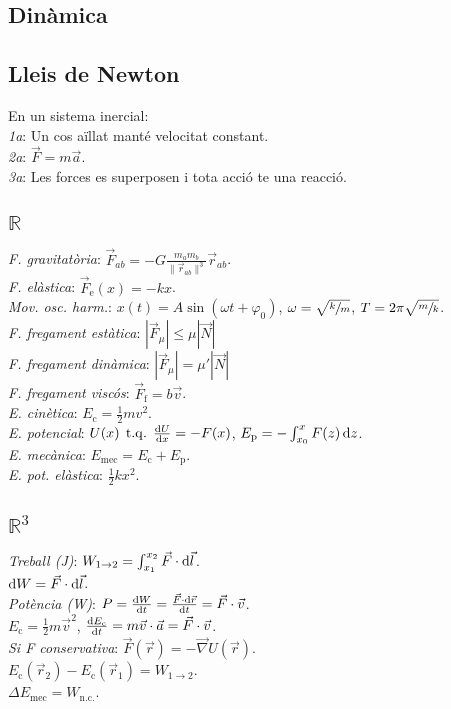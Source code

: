 \documentclass[11pt]{article}
\newcommand{\real}{\mathbb{R}}
\newcommand{\ci}{\textbullet\;}
\DeclareMathOperator{\tq}{\;t.q.\;}
\begin{document}
\begin{multicols}{4}
\section{Din\`amica}

\subsection{Lleis de Newton}
En un sistema inercial:\\
\emph{1a}: Un cos aïllat manté velocitat constant.\\
\emph{2a}: $\vec{F} = m\vec{a}$.\\
\emph{3a}: Les forces es superposen i tota acció te una reacció.

\subsection{$\real$}
\emph{F. gravitat\`oria}: $\vec{F}_{ab} = -G \frac{m_a m_b}{\|\vec{r}_{ab}\|^3} \vec{r}_{ab}$. \\
\emph{F. el\`astica}: $\vec{F}_{\text{e}}(x) = -kx$. \\
\emph{Mov. osc. harm.}: $x(t) = A\sin (\omega t + \varphi_0)$, $\omega = \sqrt{\sfrac{k}{m}}$, $T = 2\pi\sqrt{\sfrac{m}{k}}$. \\
\emph{F. fregament estàtica}: $|\vec{F}_\mu| \leq \mu |\vec{N}|$\\
\emph{F. fregament dinàmica}: $|\vec{F}_\mu| = \mu' |\vec{N}|$\\
\emph{F. fregament visc\'os}: $\vec{F}_{\text{f}} = b\vec{v}$. \\
\emph{E. cin\`etica}: $E_{\text{c}} = \frac{1}{2}mv^2$. \\
\emph{E. potencial}: $U(x) \tq \frac{\dif U}{\dif x} = -F(x)$, $E_{\text{p}} = -\int_{x_0}^x F(z) \dif z$. \\
\emph{E. mecànica}: $E_{\text{mec}} = E_{\text{c}} + E_{\text{p}}$. \\
\emph{E. pot. el\`astica}: $\frac{1}{2}kx^2$.

\subsection{$\real^3$}
\emph{Treball (J)}: $W_{1\rightarrow 2} = \int_{x_1}^{x_2} \vec{F} \cdot\dif \vec{l}$. \\
\ci $\dif W = \vec{F} \cdot\dif \vec{l}$. \\
\emph{Pot\`encia (W)}: $P = \frac{\dif W}{\dif t} = \frac{\vec{F} \cdot\dif \vec{r}}{\dif t} = \vec{F}\cdot\vec{v}$. \\
\ci $E_{\text{c}} = \frac{1}{2}m\vec{v}^2$, $\frac{\dif E_{\text{c}}}{\dif t} = m\vec{v}\cdot\vec{a} = \vec{F}\cdot\vec{v}$. \\
\emph{Si F conservativa}: $\vec{F}(\vec{r}) = -\vec{\nabla}U(\vec{r})$. \\
\ci $E_{\text{c}}(\vec{r}_2) - E_{\text{c}}(\vec{r}_1) = W_{1\rightarrow 2}$. \\
\ci $\Delta E_{\text{mec}} = W_{\text{n.c.}}$.



\end{multicols}
\end{document}
